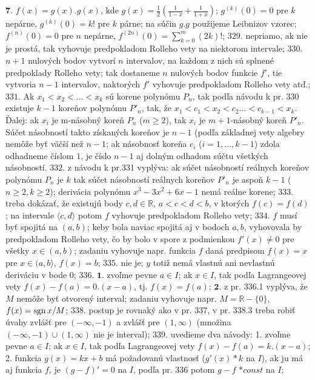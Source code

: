 $\boldsymbol{7.}$ $f(x)=g(x).g(x)$, kde $g(x)=\frac{1}{2}(\frac{1}{1-x}+\frac{1}{1+x})$; $g^{(k)}(0)=0$    pre $k$ nepárne, $g^{(k)}(0)=k!$ pre $k$ párne; na súčin  $g.g$  použijeme Leibnizov vzorec;  $f^{(n)}(0)=0$   pre $n$ nepárne,  $f^{(2n)}(0)=\sum_{k=0}^m(2 k)!$;
$\boxed{329.}$  nepriamo, ak nie je prostá, tak vyhovuje predpokladom Rolleho vety na niektorom intervale;
$\boxed{330.}$ $n+1$ nulových bodov vytvorí $n$ intervalov, na každom z nich sú splnené predpoklady Rolleho vety; tak dostaneme $n$ nulových bodov funkcie $f'$, tie vytvoria $n-1$ intervalov, naktorých $f'$ vyhovuje predpokladom Rolleho vety atď.;
$\boxed{331.}$ Ak $x_{1}<x_{2}<...<x_{k}$ sú korene polynómu $P_{n}$, tak podľa návodu k pr. 330 existuje $k-1$ koreňov polynómu $P'_{n}$, tak, že $x_{1}<c_{1}<x_{2}<c_{2}...<c_{k-1}<x_{k}$. Ďalej: ak $x_{i}$ je m-násobný koreň $P_{n}$ ($m\geq 2$), tak $x_{i}$ je $m+1$-násobný koreň $P'_{n}$. Súčet násobností takto získaných koreňov je $n-1$ (podľa základnej vety algebry nemôže byť väčší než $n-1$; ak násobnosť koreňa $c_{i}$ ($i=1,...,k-1$) zdola odhadneme číslom $1$, je číslo $n-1$ aj dolným odhadom súčtu všetkých násobností.
$\boxed{332.}$ z návodu k pr.331 vyplýva: ak súčet násobností reálnych koreňov polynómu $P_{n}$ je  $k$ tak súčet násobností reálnych koreňov $P'_{n}$ je aspoň $k-1$ ($n\geq 2, k\geq 2 $); derivácia polynómu $x^{3}-3x^{2}+6x-1$ nemá reálne korene;
$\boxed{333.}$ treba dokázať, že existujú body $c,d \in \mathbb{R}$, $a<c<d<b$, v ktorých $f(c)=f(d)$; na intervale $\langle c,d\rangle$  potom $f$ vyhovuje predpokladom  Rolleho vety; 
$\boxed{334.}$ $f$ musí byť spojitá na $(a,b)$; keby bola naviac spojitá aj v bodoch $a,b$, vyhovovala by predpokladom  Rolleho vety, čo by bolo v spore z podmienkou $f'(x)\ne 0$ pre všetky  $x \in(a,b)$; zadaniu vyhovuje napr. funkcia  $f$ daná predpisom  $f(x)=x$ pre  $x \in(a,b\rangle $,  $f(x)=b$;
$\boxed{335.}$  nie je;  $y$ totiž nemá vlastnú ani nevlastnú deriváciu v bode $0$;
$\boxed{336.}$ $\boldsymbol{1.}$ zvoľme pevne $a\in I$; ak $x\in I$, tak podľa Lagrangeovej vety  $f(x)-f(a)=0.(x-a)$, tj. $f(x)=f(a)$;
$\boldsymbol{2.}$ z pr. 336.1 vyplýva, že $M$ nemôže byť otvorený interval; zadaniu vyhovuje napr. $M=\mathbb{R}-\lbrace 0\rbrace$, $f(x)=\operatorname{sgn} x/M$;
$\boxed{338.}$ postup je rovnaký ako v pr. 337, v pr. 338.3 treba robiť úvahy zvlášť pre $(-\infty, -1)$ a zvlášť pre $(1,\infty)$ (množina $(-\infty, -1)\cup (1,\infty)$ nie je interval);
$\boxed{339.}$ uvedieme dva návody: 1. zvoľme pevne $a \in I $; ak $x \in I $, tak podľa Lagrangeovej vety  $f(x)-f(a)=k.(x-a)$; 2. funkcia $g(x)=kx+b $ má požadovanú vlastnosť ($g'(x) * k$ na $I$), ak ju má aj funkcia $f$, je $(g-f)'=0$ na $I$, podľa pr. 336 potom $g-f$ $* const$ na $I$;

